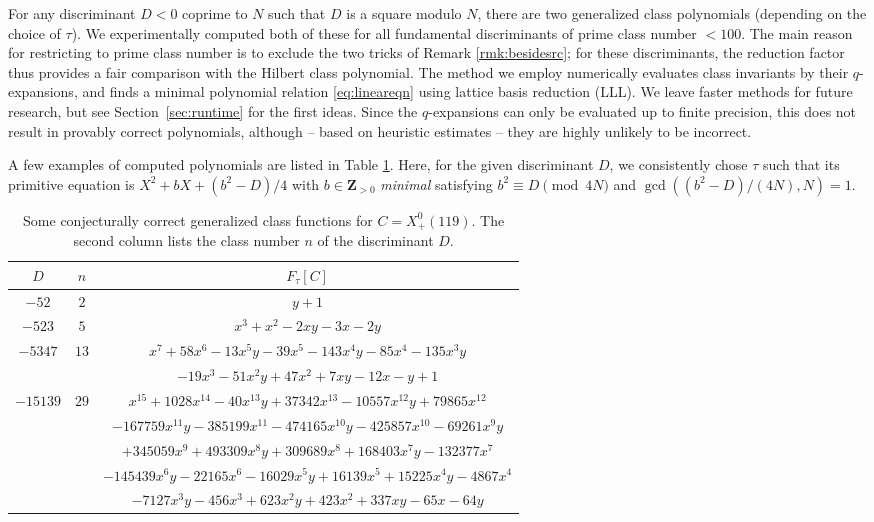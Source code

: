 \documentclass{amsart}
\newcommand{\ZZ}{\mathbf{Z}}
\newcommand{\xplus}[1]{X^0_+(#1)}
\numberwithin{equation}{section}
\theoremstyle{definition}
\begin{document}
For any discriminant $D<0$ coprime to $N$ such that $D$ is a square modulo $N$,
there are two generalized class polynomials (depending on the choice of $\tau$).
We experimentally computed both of these for all fundamental discriminants of prime class number $<100$.
The main reason for restricting to prime class number is to exclude the two tricks of Remark \ref{rmk:besidesrc};
for these discriminants,
the reduction factor thus provides a fair comparison
with the Hilbert class polynomial.
The method we employ numerically evaluates class invariants by their $q$-expansions, and finds a minimal polynomial relation \eqref{eq:lineareqn} using lattice basis reduction (LLL).
We leave faster methods for future research, but see Section~\ref{sec:runtime} for the first ideas.
Since the $q$-expansions can only be evaluated up to finite precision, this does not result in provably correct polynomials,
although -- based on heuristic estimates -- they are highly unlikely to be incorrect.

A few examples of computed polynomials are listed in Table \ref{tab:119}.
Here, for the given discriminant $D$,
we consistently chose $\tau$ such that its primitive equation is $X^2+bX+(b^2-D)/4$
with $b\in\ZZ_{>0}$ \emph{minimal} satisfying $b^2\equiv D\pmod{4N}$
and $\gcd((b^2-D)/(4N) ,N) = 1$.


\begin{table}[htbp]
\setlength{\tabcolsep}{3pt}
\renewcommand{\arraystretch}{1.2}
\begin{tabular}{c|c|c}
 $D$  & $n$ & $F_{\tau}[C]$ \\ \hline
 $-52$ & $2$ & $y+1$ \\ \hline
 $-523$ & $5$ & $x^3 + x^2 - 2xy - 3x - 2y$\\ \hline
 \multirow{2}{*}{$-5347$} & \multirow{2}{*}{$13$} & $x^7 + 58 x^6 - 13 x^5 y - 39 x^5 - 143 x^4 y - 85 x^4 - 135 x^3 y$\\
 & &  $- 19 x^3 - 51 x^2 y + 47 x^2 + 7 x y - 12 x - y + 1$ \\ \hline
 \multirow{5}{*}{$-15139$} & \multirow{5}{*}{$29$} & $x^{15} + 1028x^{14} - 40x^{13}y + 37342x^{13} - 10557x^{12}y + 79865x^{12}$\\
 & & $  - 167759x^{11}y - 385199x^{11} - 474165x^{10}y - 425857x^{10} - 69261x^9y$\\
 & &   $+345059x^9 + 493309x^8y + 309689x^8 + 168403x^7y - 132377x^7 $\\
 & & $- 145439x^6y - 22165x^6 - 16029x^5y + 16139x^5 + 15225x^4y - 4867x^4$\\
 & & $ - 7127x^3y - 456x^3 + 623x^2y + 423x^2 + 337xy - 65x - 64y$\\ \hline
\end{tabular}
\\[2mm]
\caption{Some conjecturally correct generalized class functions for $C=\xplus{119}$. The second column lists the class number $n$ of the discriminant $D$.}
\label{tab:119}
\end{table}
\end{document}
